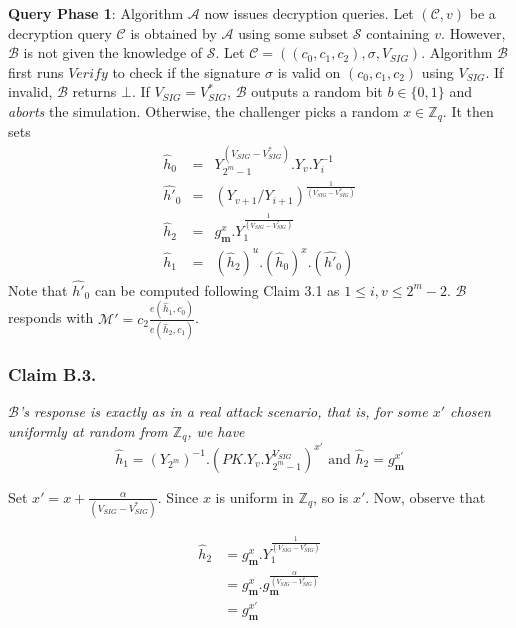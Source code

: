 \noindent\textbf{Query Phase 1}: Algorithm $\mathcal{A}$ now issues decryption queries. Let $(\mathcal{C},v)$ be a decryption query $\mathcal{C}$ is obtained by $\mathcal{A}$ using some subset $\mathcal{S}$ containing $v$. However, $\mathcal{B}$ is not given the knowledge of $\mathcal{S}$. Let $\mathcal{C}=((c_0,c_1,c_2),\sigma,V_{SIG})$. Algorithm $\mathcal{B}$ first runs $Verify$ to check if the signature $\sigma$ is valid on $(c_0,c_1,c_2)$ using $V_{SIG}$. If invalid, $\mathcal{B}$ returns $\bot$. If $V_{SIG} = V^{*}_{SIG}$, $\mathcal{B}$ outputs a random bit $b\in\{0,1\}$ and \emph{aborts} the simulation. Otherwise, the challenger picks a random $x\in\mathbb{Z}_q$. It then sets
\begin{eqnarray}
 \hat{h}_0&=&Y^{(V_{SIG}-V^{*}_{SIG})}_{2^m-1}.Y_v.Y^{-1}_i\nonumber\\
 \hat{h'}_0&=&(Y_{v+1}/Y_{i+1})^{\frac{1}{(V_{SIG}-V^{*}_{SIG})}}\nonumber \\
 \hat{h}_2&=&g^{x}_{\mathbf{m}}.Y^{\frac{1}{(V_{SIG}-V^{*}_{SIG})}}_1\nonumber\\
 \hat{h}_1&=&\left(\hat{h}_2\right)^u.\left(\hat{h}_0\right)^x.\left(\hat{h'}_0\right) \nonumber 
\end{eqnarray}
\noindent Note that $\hat{h'}_0$ can be computed following Claim 3.1 as $1\leq i,v \leq 2^m-2$. $\mathcal{B}$ responds with $\mathcal{M}'=c_2\frac{{e}(\hat{h}_1,c_0)}{{e}(\hat{h}_2,c_1)}$. 

\subsubsection{Claim B.3.} \textit{$\mathcal{B}$'s response is exactly as in a real attack scenario, that is, for some $x'$ chosen uniformly at random from $\mathbb{Z}_q$, we have} 
\begin{equation}
\hat{h}_1 = \left({Y_{2^m}}\right)^{-1}.\left(PK.Y_v.Y^{V_{SIG}}_{2^m-1}\right)^{x'}  \text{ and }  \hat{h}_2 = g^{x'}_{\mathbf{m}}\nonumber
\end{equation}

 Set $x'=x+\frac{\alpha}{(V_{SIG}-V^{*}_{SIG})}$. Since $x$ is uniform in $\mathbb{Z}_q$, so is $x'$. Now, observe that 

\begin{equation}
\begin{split}
 \hat{h}_2&=g^{x}_{\mathbf{m}}.Y^{\frac{1}{(V_{SIG}-V^{*}_{SIG})}}_1\\
 &= g^{x}_{\mathbf{m}}.g^{\frac{\alpha}{(V_{SIG}-V^{*}_{SIG})}}_{\mathbf{m}}\\
 &= g^{x'}_{\mathbf{m}}\nonumber
\end{split}
\end{equation}

